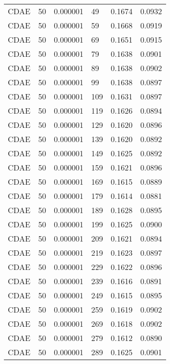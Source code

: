 \begin{tabular}{llrlrr}
    CDAE &   50 &  0.000001 &    49 &  0.1674 &       0.0932 \\
    CDAE &   50 &  0.000001 &    59 &  0.1668 &       0.0919 \\
    CDAE &   50 &  0.000001 &    69 &  0.1651 &       0.0915 \\
    CDAE &   50 &  0.000001 &    79 &  0.1638 &       0.0901 \\
    CDAE &   50 &  0.000001 &    89 &  0.1638 &       0.0902 \\
    CDAE &   50 &  0.000001 &    99 &  0.1638 &       0.0897 \\
    CDAE &   50 &  0.000001 &   109 &  0.1631 &       0.0897 \\
    CDAE &   50 &  0.000001 &   119 &  0.1626 &       0.0894 \\
    CDAE &   50 &  0.000001 &   129 &  0.1620 &       0.0896 \\
    CDAE &   50 &  0.000001 &   139 &  0.1620 &       0.0892 \\
    CDAE &   50 &  0.000001 &   149 &  0.1625 &       0.0892 \\
    CDAE &   50 &  0.000001 &   159 &  0.1621 &       0.0896 \\
    CDAE &   50 &  0.000001 &   169 &  0.1615 &       0.0889 \\
    CDAE &   50 &  0.000001 &   179 &  0.1614 &       0.0881 \\
    CDAE &   50 &  0.000001 &   189 &  0.1628 &       0.0895 \\
    CDAE &   50 &  0.000001 &   199 &  0.1625 &       0.0900 \\
    CDAE &   50 &  0.000001 &   209 &  0.1621 &       0.0894 \\
    CDAE &   50 &  0.000001 &   219 &  0.1623 &       0.0897 \\
    CDAE &   50 &  0.000001 &   229 &  0.1622 &       0.0896 \\
    CDAE &   50 &  0.000001 &   239 &  0.1616 &       0.0891 \\
    CDAE &   50 &  0.000001 &   249 &  0.1615 &       0.0895 \\
    CDAE &   50 &  0.000001 &   259 &  0.1619 &       0.0902 \\
    CDAE &   50 &  0.000001 &   269 &  0.1618 &       0.0902 \\
    CDAE &   50 &  0.000001 &   279 &  0.1612 &       0.0890 \\
    CDAE &   50 &  0.000001 &   289 &  0.1625 &       0.0901 \\

\end{tabular}

